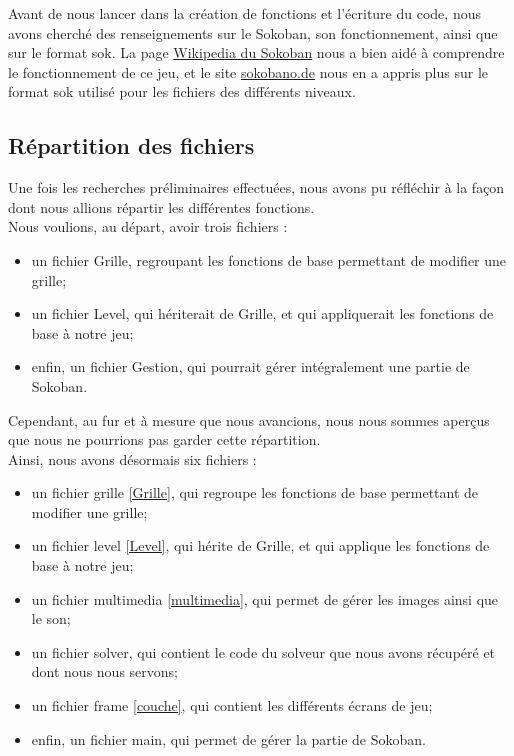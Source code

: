 \documentclass[a4paper,12pt]{article} %
\begin{document}
Avant de nous lancer dans la création de fonctions et l'écriture du code, nous avons cherché des renseignements sur le Sokoban, son fonctionnement, ainsi que sur le format sok. La page \href{https://fr.wikipedia.org/wiki/Sokoban}{Wikipedia du Sokoban} nous a bien aidé à comprendre le fonctionnement de ce jeu, et le site \href{http://sokobano.de/wiki/index.php?title=Sok_format}{sokobano.de} nous en a appris plus sur le format sok utilisé pour les fichiers des différents niveaux.

\subsection{Répartition des fichiers}

Une fois les recherches préliminaires effectuées, nous avons pu réfléchir à la façon dont nous allions répartir les différentes fonctions.
\\
Nous voulions, au départ, avoir trois fichiers :
\begin{itemize}
	\item un fichier Grille, regroupant les fonctions de base permettant de modifier une grille;
	\item un fichier Level, qui hériterait de Grille, et qui appliquerait les fonctions de base à notre jeu;
	\item enfin, un fichier Gestion, qui pourrait gérer intégralement une partie de Sokoban.
\end{itemize}

Cependant, au fur et à mesure que nous avancions, nous nous sommes aperçus que nous ne pourrions pas garder cette répartition.
\\
Ainsi, nous avons désormais six fichiers :
\begin{itemize}
	\item un fichier grille \ref{Grille}, qui regroupe les fonctions de base permettant de modifier une grille;
	\item un fichier level \ref{Level}, qui hérite de Grille, et qui applique les fonctions de base à notre jeu;
	\item un fichier multimedia \ref{multimedia}, qui permet de gérer les images ainsi que le son;
	\item un fichier solver, qui contient le code du solveur que nous avons récupéré et dont nous nous servons;
	\item un fichier frame \ref{couche}, qui contient les différents écrans de jeu;
	\item enfin, un fichier main, qui permet de gérer la partie de Sokoban.
\end{itemize}
\end{document}
